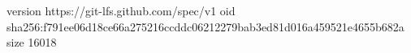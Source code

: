 version https://git-lfs.github.com/spec/v1
oid sha256:f791ee06d18ce66a275216ccddc06212279bab3ed81d016a459521e4655b682a
size 16018
